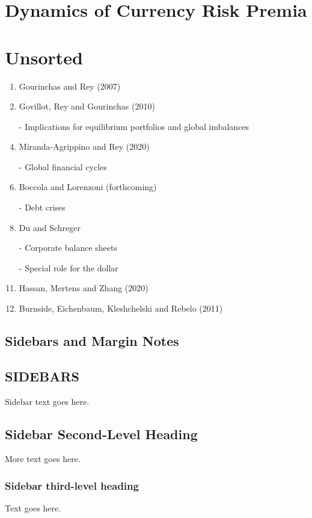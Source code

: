 \documentclass{ar-1col}
\begin{document}
\section{Dynamics of Currency Risk Premia}


\section{Unsorted}
\begin{enumerate}
\item Gourinchas and Rey (2007)
\item Govillot, Rey and Gourinchas (2010)
\item[-] Implications for equilibrium portfolios and global imbalances
\item Miranda-Agrippino and Rey (2020)
\item[-] Global financial cycles
\item Boccola and Lorenzoni (forthcoming)
\item[-] Debt crises
\item Du and Schreger
\item[-] Corporate balance sheets
\item[-] Special role for the dollar
\item Hassan, Mertens and Zhang (2020)
\item Burnside, Eichenbaum, Kleshchelski and Rebelo (2011)
\end{enumerate}



\subsection{Sidebars and Margin Notes}
\begin{marginnote}[]
    
\end{marginnote}

\begin{textbox}[h]\section{SIDEBARS}
  Sidebar text goes here.
  \subsection{Sidebar Second-Level Heading}
  More text goes here.\subsubsection{Sidebar third-level heading} Text
  goes here.\end{textbox}
\end{document}
